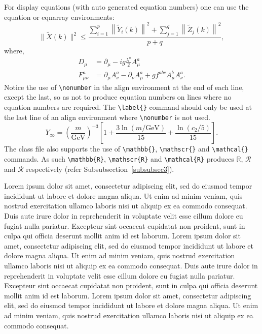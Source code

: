 \documentclass[unnumsec,webpdf,contemporary,large]{oup-authoring-template}%
\theoremstyle{thmstyleone}%
\theoremstyle{thmstyletwo}%
\theoremstyle{thmstylethree}%
\begin{document}
For display equations (with auto generated equation numbers)
one can use the equation or eqnarray environments:
\begin{equation}
	\|\tilde{X}(k)\|^2 \leq\frac{\sum\limits_{i=1}^{p}\left\|\tilde{Y}_i(k)\right\|^2+\sum\limits_{j=1}^{q}\left\|\tilde{Z}_j(k)\right\|^2 }{p+q},\label{eq1}
\end{equation}
where,
\begin{align}
	D_\mu        & =  \partial_\mu - ig \frac{\lambda^a}{2} A^a_\mu \nonumber                            \\
	F^a_{\mu\nu} & = \partial_\mu A^a_\nu - \partial_\nu A^a_\mu + g f^{abc} A^b_\mu A^a_\nu.\label{eq2}
\end{align}
Notice the use of \verb+\nonumber+ in the align environment at the end
of each line, except the last, so as not to produce equation numbers on
lines where no equation numbers are required. The \verb+\label{}+ command
should only be used at the last line of an align environment where
\verb+\nonumber+ is not used.
\begin{equation}
	Y_\infty = \left( \frac{m}{\textrm{GeV}} \right)^{-3}
	\left[ 1 + \frac{3 \ln(m/\textrm{GeV})}{15}
		+ \frac{\ln(c_2/5)}{15} \right].
\end{equation}
The class file also supports the use of \verb+\mathbb{}+, \verb+\mathscr{}+ and
\verb+\mathcal{}+ commands. As such \verb+\mathbb{R}+, \verb+\mathscr{R}+
and \verb+\mathcal{R}+ produces $\mathbb{R}$, $\mathscr{R}$ and $\mathcal{R}$
respectively (refer Subsubsection~\ref{subsubsec3}).


Lorem ipsum dolor sit amet, consectetur adipiscing elit, sed do
eiusmod tempor incididunt ut labore et dolore magna aliqua. Ut enim ad minim veniam, quis nostrud exercitation ullamco laboris nisi ut aliquip ex ea commodo consequat. Duis aute irure dolor in reprehenderit in voluptate velit esse cillum dolore eu fugiat nulla pariatur. Excepteur sint occaecat cupidatat non proident, sunt in culpa qui officia deserunt mollit anim id est laborum. Lorem ipsum dolor sit amet, consectetur adipiscing elit, sed do
eiusmod tempor incididunt ut labore et dolore magna aliqua. Ut enim ad minim veniam, quis nostrud exercitation ullamco laboris nisi ut aliquip ex ea commodo consequat. Duis aute irure dolor in reprehenderit in voluptate velit esse cillum dolore eu fugiat nulla pariatur. Excepteur sint occaecat cupidatat non proident, sunt in culpa qui officia deserunt mollit anim id est laborum.
Lorem ipsum dolor sit amet, consectetur adipiscing elit, sed do
eiusmod tempor incididunt ut labore et dolore magna aliqua. Ut enim ad minim veniam, quis nostrud exercitation ullamco laboris nisi ut aliquip ex ea commodo consequat.
\end{document}
